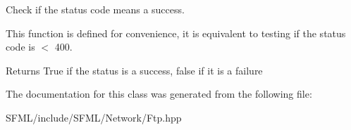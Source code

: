 Check if the status code means a success. 

This function is defined for convenience, it is equivalent to testing if the status code is $<$ 400.

\begin{DoxyReturn}{Returns}
True if the status is a success, false if it is a failure \begin{DoxyVerb}\end{DoxyVerb}
 
\end{DoxyReturn}


The documentation for this class was generated from the following file\+:\begin{DoxyCompactItemize}
\item 
S\+F\+M\+L/include/\+S\+F\+M\+L/\+Network/Ftp.\+hpp\end{DoxyCompactItemize}
